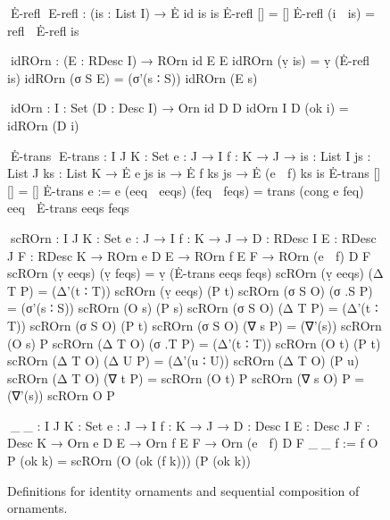 \begin{figure}
\codefigure\small
\begin{code}
^^^Ė-refl ^^^E-refl : (is : List I) → Ė id is is
Ė-refl []        = []
Ė-refl (i ∷ is)  = refl ∷ Ė-refl is

^^^idROrn : (E : RDesc I) → ROrn id E E
idROrn (ṿ is)   = ṿ (Ė-refl is)
idROrn (σ S E)  = (σ'(s ∶ S)) idROrn (E s)

^^^idOrn : {I : Set} (D : Desc I) → Orn id D D
idOrn {I} D (ok i) = idROrn (D i)

^^^Ė-trans ^^^E-trans :  {I J K : Set} {e : J → I} {f : K → J} →
              {is : List I} {js : List J} {ks : List K} →
              Ė e js is → Ė f ks js → Ė (e ∘ f) ks is
Ė-trans           []            []            =  []
Ė-trans {e := e}  (eeq ∷ eeqs)  (feq ∷ feqs)  =  trans (cong e feq) eeq ∷ Ė-trans eeqs feqs

^^^scROrn :  {I J K : Set} {e : J → I} {f : K → J} →
             {D : RDesc I} {E : RDesc J} {F : RDesc K} →
             ROrn e D E → ROrn f E F → ROrn (e ∘ f) D F
scROrn (ṿ eeqs)  (ṿ feqs)  = ṿ (Ė-trans eeqs feqs)
scROrn (ṿ eeqs)  (Δ T P)   = (Δ'(t ∶ T))  scROrn (ṿ eeqs)  (P t)
scROrn (σ S O)   (σ .S P)  = (σ'(s ∶ S))  scROrn (O s)     (P s)
scROrn (σ S O)   (Δ T P)   = (Δ'(t ∶ T))  scROrn (σ S O)   (P t)
scROrn (σ S O)   (∇ s P)   = (∇'(s))      scROrn (O s)     P
scROrn (Δ T O)   (σ .T P)  = (Δ'(t ∶ T))  scROrn (O t)     (P t)
scROrn (Δ T O)   (Δ U P)   = (Δ'(u ∶ U))  scROrn (Δ T O)   (P u)
scROrn (Δ T O)   (∇ t P)   =              scROrn (O t)     P
scROrn (∇ s O)   P         = (∇'(s))      scROrn O         P

^^^_⊙_ :  {I J K : Set} {e : J → I} {f : K → J} →
          {D : Desc I} {E : Desc J} {F : Desc K} →
          Orn e D E → Orn f E F → Orn (e ∘ f) D F
_⊙_ {f := f} O P (ok k) = scROrn (O (ok (f k))) (P (ok k))
\end{code}
\caption{Definitions for identity ornaments and sequential composition of ornaments.}
\label{fig:sequential-composition}
\end{figure}

